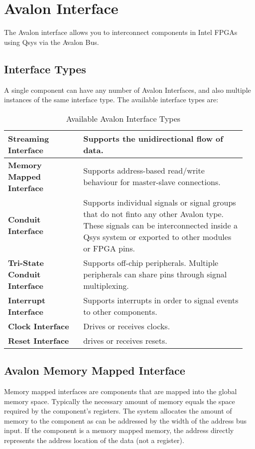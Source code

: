\section{Avalon Interface}
	The Avalon interface allows you to interconnect components in Intel FPGAs using Qsys via the Avalon Bus.
	
	\subsection{Interface Types }
		A single component can have any number of Avalon Interfaces, and also multiple instances of the same interface type. The available interface types are:
		\begin{table}[H]
			\centering
			\begin{tabular}{|>{\bfseries}p{0.3\linewidth}|p{0.65\linewidth}|}
				\hline
				Streaming Interface
					& Supports the unidirectional flow of data.\\
				\hline
				Memory Mapped Interface
					& Supports address-based read/write behaviour for master-slave connections.\\
				\hline
				Conduit Interface
					& Supports individual signals or signal groups that do not finto any other Avalon type.
					These signals can be interconnected inside a Qsys system or exported to other modules or FPGA pins.\\
				\hline
				Tri-State Conduit Interface
					& Supports off-chip peripherals. Multiple peripherals can share pins through signal multiplexing.\\
				\hline
				Interrupt Interface
					& Supports interrupts in order to signal events to other components.\\
				\hline
				Clock Interface
					& Drives or receives clocks.\\
				\hline
				Reset Interface
					& drives or receives resets.\\
				\hline	
			\end{tabular}
			\caption{Available Avalon Interface Types}
		\end{table}
		
	\subsection{Avalon Memory Mapped Interface }
		Memory mapped interfaces are components that are mapped into the global memory space. Typically the necessary amount of memory equals the space required by the component's registers. The system allocates the amount of memory to the component as can be addressed by the width of the address bus input. If the component is a memory mapped memory, the address directly represents the address location of the data (not a register).
		
